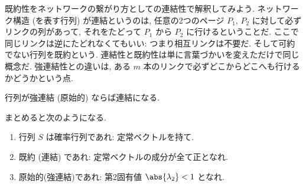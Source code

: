 \documentclass[openany, a4paper, oneside]{jsbook}
\begin{document}
{既約性をネットワークの繋がり方としての連結性で解釈してみよう.
ネットワーク構造 (を表す行列) が連結というのは,
任意の2つのページ $P_1, \, P_2$ に対して必ずリンクの列があって,
それをたどって $P_1$ から $P_2$ に行けるということだ.
ここで同じリンクは逆にたどれなくてもいい: つまり相互リンクは不要だ.
そして可約でない行列を既約という.
連結性と既約性は単に言葉づかいを変えただけで同じ概念だ.
強連結性との違いは, ある $m$ 本のリンクで必ずどこからどこへも行けるかどうかという点.
\begin{rem}
行列が強連結 (原始的) ならば連結になる.
\end{rem}

まとめると次のようになる.
\begin{enumerate}
\item 行列 $S$ は確率行列であれ: 定常ベクトルを持て.
\item 既約 (連結) であれ: 定常ベクトルの成分が全て正となれ.
\item 原始的(強連結)であれ: 第2固有値 $\abs{\lambda_2} < 1$ となれ.
\end{enumerate}

}
\end{document}
